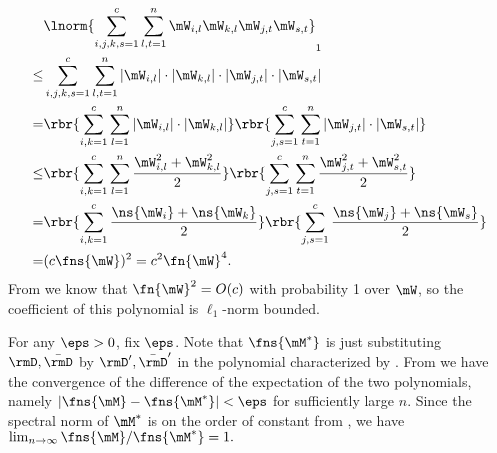 \begin{proofof}{}
\begin{proofof}{}
\begin{equation}
\label{eqn:proof-Mfnorm-poly-l1bound}
\begin{split}
     &\lnorm{\sum_{i,j,k,s=1}^c\sum_{l,t=1}^n \mW_{i,l}\mW_{k,l}\mW_{j,t}\mW_{s,t}}_1\\
    \leq &\sum_{i,j,k,s=1}^c\sum_{l,t=1}^n |\mW_{i,l}|\cdot|\mW_{k,l}|\cdot|\mW_{j,t}|\cdot|\mW_{s,t}|\\
    =&\rbr{\sum_{i,k=1}^c\sum_{l=1}^n|\mW_{i,l}|\cdot|\mW_{k,l}|}\rbr{\sum_{j,s=1}^c\sum_{t=1}^n|\mW_{j,t}|\cdot|\mW_{s,t}|}\\
    \leq &\rbr{\sum_{i,k=1}^c\sum_{l=1}^n\frac{\mW_{i,l}^2+\mW_{k,l}^2}{2}}\rbr{\sum_{j,s=1}^c\sum_{t=1}^n\frac{\mW_{j,t}^2+\mW_{s,t}^2}{2}}\\
    =&\rbr{\sum_{i,k=1}^c\frac{\ns{\mW_i}+\ns{\mW_k}}{2}}\rbr{\sum_{j,s=1}^c\frac{\ns{\mW_j}+\ns{\mW_s}}{2}}\\
    =&(c\fns{\mW})^2=c^2\fn{\mW}^4.
\end{split}
\end{equation}
From  we know that $\fn{\mW}^2=O(c)$ with probability 1 over $\mW$, so the coefficient of this polynomial is $\ell_1$-norm bounded.

For any $\eps>0$, fix $\eps$. Note that $\fns{\mM^*}$ is just substituting $\rmD,\bar\rmD$ by $\rmD',\bar\rmD'$ in the polynomial characterized by . From  we have the convergence of the difference of the expectation of the two polynomials, namely $|\fns{\mM} - \fns{\mM^*}| < \eps$ for sufficiently large $n$.
Since the spectral norm of $\mM^*$ is on the order of constant from , we have $\lim_{n\to\infty} \fns{\mM}/\fns{\mM^*}=1.$
\end{proofof}


\end{proofof}
